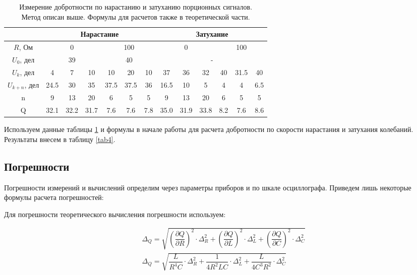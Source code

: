 \documentclass{lab}
\begin{document}
\begin{table}[H]
	\centering
	\renewcommand{\arraystretch}{1.3}
	\begin{tabular}{|c|c|c|c|c|c|c|c|c|c|c|c|c|}
		\hline
						& \multicolumn{6}{c|}{Нарастание}						& \multicolumn{6}{c|}{Затухание}						\\ \hline
		$R$, Ом			& \multicolumn{3}{c|}{0}	& \multicolumn{3}{c|}{100}	& \multicolumn{3}{c|}{0}	& \multicolumn{3}{c|}{100}	\\ \hline
		$U_{0}$, дел	& \multicolumn{3}{c|}{39}	& \multicolumn{3}{c|}{40}	& \multicolumn{6}{c|}{-} 								\\ \hline
		$U_{k}$, дел	& 4 	& 7		& 10	& 10	& 20	& 10	& 37	& 36	& 32	& 40	& 31.5	& 40	\\ \hline
		$U_{k+n}$, дел	& 24.5 	& 30	& 35	& 37.5	& 37.5	& 36	& 16.5	& 10	& 5		& 4		& 4		& 6.5	\\ \hline
		n				& 9		& 13	& 20	& 6		& 5		& 5		& 9		& 13	& 20	& 6		& 5		& 5		\\ \hline
		Q 				& 32.1	& 32.2	& 31.7	& 7.6	& 7.6	& 7.8	& 35.0	& 31.9	& 33.8	& 8.2	& 7.6 	& 8.6	\\ \hline
	\end{tabular}
	\caption{\footnotesize Измерение добротности по нарастанию и затуханию порционных сигналов.\\
	Метод описан выше. Формулы для расчетов также в теоретической части.}
	\label{tab3}
	\renewcommand{\arraystretch}{1}
\end{table}

Используем данные таблицы \ref{tab3} и формулы в начале работы для расчета добротности по
скорости нарастания и затухания колебаний. Результаты внесем в таблицу \ref{tab4}.

\subsection*{Погрешности}

Погрешности измерений и вычислений определим через параметры приборов и по шкале
осциллографа. Приведем лишь некоторые формулы расчета погрешностей:

Для погрешности теоретического вычисления погрешности используем:

\begin{equation}
\begin{aligned}
	&\Delta_Q = \sqrt{\left( \dfrac{\partial Q}{\partial R} \right)^2 \cdot \Delta_R^2 +
	\left( \dfrac{\partial Q}{\partial L} \right)^2 \cdot \Delta_L^2 + \left( \dfrac{\partial Q}{\partial C} \right)^2 \cdot \Delta_C^2} \\
	&\Delta_Q = \sqrt{\dfrac{L}{R^4C} \cdot \Delta_R^2 + \dfrac{1}{4R^2LC} \cdot \Delta_L^2 + \dfrac{L}{4C^3R^2} \cdot \Delta_C^2}
\end{aligned}
\end{equation}
\end{document}
